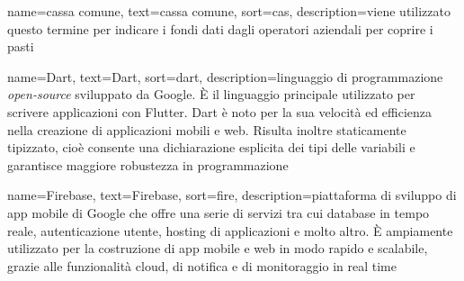 


%


 {
    name=cassa comune,
    text=cassa comune,
    sort=cas,
    description={viene utilizzato questo termine per indicare i fondi dati dagli operatori aziendali per coprire i pasti}
}

 {
    name=Dart,
    text=Dart,
    sort=dart,
    description={linguaggio di programmazione \textit{open-source} sviluppato da Google. 
    È il linguaggio principale utilizzato per scrivere applicazioni con Flutter. Dart è noto per la sua velocità ed efficienza nella creazione di applicazioni mobili e web.
    Risulta inoltre staticamente tipizzato, cioè consente una dichiarazione esplicita dei tipi delle variabili e garantisce maggiore robustezza in programmazione}
}

 {
    name=Firebase,
    text=Firebase,
    sort=fire,
    description={piattaforma di sviluppo di app mobile di Google che offre una serie di servizi tra cui database in tempo reale, autenticazione utente, hosting di applicazioni e molto altro. 
    È ampiamente utilizzato per la costruzione di app mobile e web in modo rapido e scalabile, grazie alle funzionalità cloud, di notifica e di monitoraggio in real time}
}

